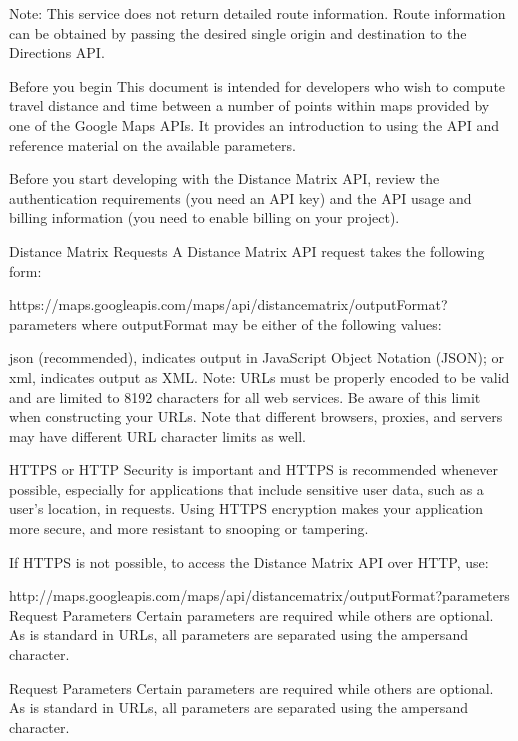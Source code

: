 Note: This service does not return detailed route information. Route information can be obtained by passing the desired single origin and destination to the Directions API.

Before you begin
This document is intended for developers who wish to compute travel distance and time between a number of points within maps provided by one of the Google Maps APIs. It provides an introduction to using the API and reference material on the available parameters.

Before you start developing with the Distance Matrix API, review the authentication requirements (you need an API key) and the API usage and billing information (you need to enable billing on your project).

Distance Matrix Requests
A Distance Matrix API request takes the following form:

https://maps.googleapis.com/maps/api/distancematrix/outputFormat?parameters
where outputFormat may be either of the following values:

json (recommended), indicates output in JavaScript Object Notation (JSON); or
xml, indicates output as XML.
Note: URLs must be properly encoded to be valid and are limited to 8192 characters for all web services. Be aware of this limit when constructing your URLs. Note that different browsers, proxies, and servers may have different URL character limits as well.

HTTPS or HTTP
Security is important and HTTPS is recommended whenever possible, especially for applications that include sensitive user data, such as a user's location, in requests. Using HTTPS encryption makes your application more secure, and more resistant to snooping or tampering.

If HTTPS is not possible, to access the Distance Matrix API over HTTP, use:

http://maps.googleapis.com/maps/api/distancematrix/outputFormat?parameters
Request Parameters
Certain parameters are required while others are optional. As is standard in URLs, all parameters are separated using the ampersand  character.

Request Parameters
Certain parameters are required while others are optional. As is standard in URLs, all parameters are separated using the ampersand character.

